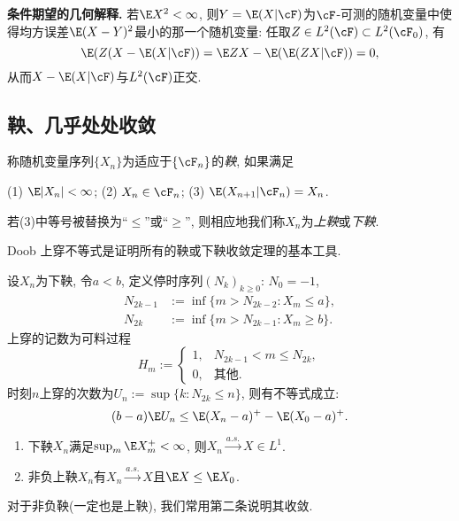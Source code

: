 \documentclass[a4paper, 10pt]{ctexart}
\begin{document}
\textbf{条件期望的几何解释.} 
若$\E X^2 < \infty$, 则$Y = \E(X|\cF)$为$\cF$-可测的随机变量中使得均方误差$\E(X-Y)^2$最小的那一个随机变量: 任取$Z \in L^2(\cF) \subset L^2(\cF_0)$, 有
\begin{equation*}
	\E(Z(X - \E(X|\cF))
	= \E ZX - \E(\E(ZX|\cF))
	= 0, 
\end{equation*}
从而$X-\E(X|\cF)$与$L^2(\cF)$正交. 
\subsection{鞅、几乎处处收敛}
称随机变量序列$\{X_n\}$为适应于$\{\cF_n\}$的\emph{鞅}, 如果满足
\begin{center}
	(1) $\E |X_n| < \infty$; \quad
	(2) $X_n \in \cF_n$; \quad
	(3) $\E(X_{n+1}|\cF_n) = X_n$.
\end{center}
若(3)中等号被替换为“$\leq$”或“$\geq$”, 则相应地我们称$X_n$为\emph{上鞅}或\emph{下鞅}. 

Doob 上穿不等式是证明所有的鞅或下鞅收敛定理的基本工具.

\begin{theorem}[Doob上穿不等式]\label{thm:Upcrossing}
	设$X_n$为下鞅, 令$a < b$, 定义停时序列$(N_k)_{k \geq 0}$: $N_0 = -1$, 
	\begin{align*}
		N_{2k-1} &:= \inf\{m > N_{2k-2} \colon X_m \leq a\}, \\
		N_{2k} &:= \inf\{m > N_{2k-1} \colon X_m \geq b\}. 
	\end{align*}
	上穿的记数为可料过程
	\begin{equation*}
		H_m :=
		\begin{cases}
			1, & N_{2k - 1} < m \leq N_{2k}, \\
			0, & \text{其他}.
		\end{cases}
	\end{equation*}
	时刻$n$上穿的次数为$U_n:= \sup\{k \colon N_{2k} \leq n\}$, 
	则有不等式成立: 
	\begin{equation}
		(b-a) \E U_n \leq \E(X_n-a)^+ - \E(X_0 - a)^+. 
	\end{equation}
\end{theorem}

\begin{theorem}[鞅收敛定理] \label{thm:MartingaleConvergence}
	\begin{enumerate}
		\item 下鞅$X_n$满足$\sup_m \E X_m^+ < \infty$, 则$X_n \stackrel{a.s.}{\to} X \in L^1$. 
		\item 非负上鞅$X_n$有$X_n \stackrel{a.s.}{\to} X$且$\E X \leq \E X_0$. 
	\end{enumerate}
\end{theorem}
\begin{remark}
	对于非负鞅(一定也是上鞅), 我们常用第二条说明其收敛. 
\end{remark}
\end{document}

